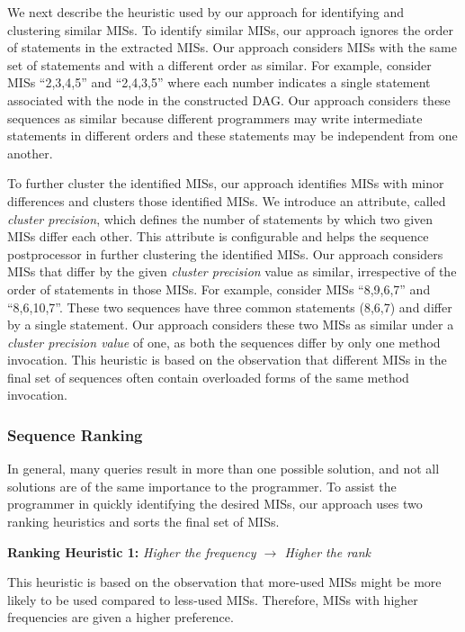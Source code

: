 \documentclass{fp035-thummalapenta}
\begin{document}
We next describe the heuristic used
by our approach for identifying and clustering similar MISs.
To identify similar MISs, our approach ignores the order of statements in the
extracted MISs. Our approach considers MISs with the same set of
statements and with a different order as similar.
For example, consider MISs ``2,3,4,5'' and ``2,4,3,5'' where each
number indicates a single statement associated with the node
in the constructed DAG. Our approach considers
these sequences as similar because different programmers
may write intermediate statements in different orders and these
statements may be independent from one another.

To further cluster the identified MISs, 
our approach identifies MISs with minor differences and
clusters those identified MISs. We introduce an attribute,
called \emph{cluster precision}, which defines the number of statements by
which two given MISs differ each other. This attribute is
configurable and helps the sequence postprocessor in further 
clustering the identified MISs. Our approach considers
MISs that differ by the given \emph{cluster precision} value
as similar, irrespective of the order of statements in
those MISs. For example, consider MISs ``8,9,6,7'' and ``8,6,10,7''. These two
sequences have three common statements (8,6,7) and differ by a
single statement. Our approach considers these two MISs as similar
under a \emph{cluster precision value} of one, as both the sequences
differ by only one method invocation. This heuristic is based on the
observation that different MISs in the final set of sequences often
contain overloaded forms of the same method invocation.
\subsubsection{Sequence Ranking}
\label{sec:rankingCriteria}

In general, many queries result in more than one possible solution,
and not all solutions are of the same importance to the programmer.
To assist the programmer in quickly identifying the desired MISs,
our approach uses two ranking heuristics and sorts the final
set of MISs.

\textbf{Ranking Heuristic 1:} \emph{Higher the frequency
$\rightarrow$ Higher the rank}

This heuristic is based on the observation that more-used MISs might
be more likely to be used compared to less-used MISs. Therefore,
MISs with higher frequencies are given a higher preference.
\end{document}
